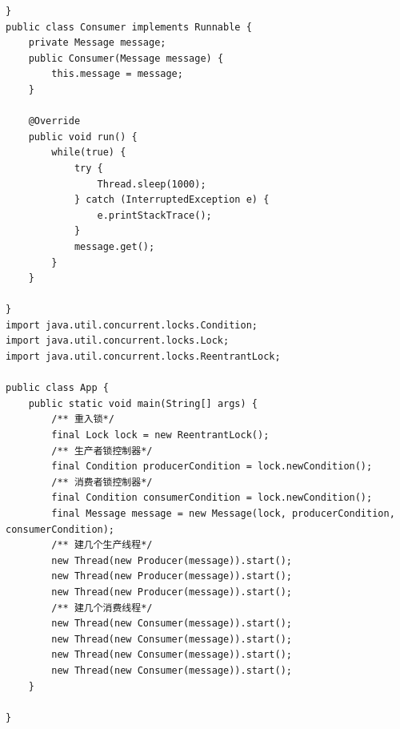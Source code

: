 \begin{lstlisting}
}
public class Consumer implements Runnable {
	private Message message;
	public Consumer(Message message) {
		this.message = message;
	}
	
	@Override
	public void run() {
		while(true) {
			try {
				Thread.sleep(1000);
			} catch (InterruptedException e) {
				e.printStackTrace();
			}
			message.get();
		}
	}
	
}
import java.util.concurrent.locks.Condition;
import java.util.concurrent.locks.Lock;
import java.util.concurrent.locks.ReentrantLock;

public class App {
	public static void main(String[] args) {
		/** 重入锁*/
		final Lock lock = new ReentrantLock();
		/** 生产者锁控制器*/
		final Condition producerCondition = lock.newCondition();
		/** 消费者锁控制器*/
		final Condition consumerCondition = lock.newCondition();
		final Message message = new Message(lock, producerCondition, consumerCondition);
		/** 建几个生产线程*/
		new Thread(new Producer(message)).start();
		new Thread(new Producer(message)).start();
		new Thread(new Producer(message)).start();
		/** 建几个消费线程*/
		new Thread(new Consumer(message)).start();
		new Thread(new Consumer(message)).start();
		new Thread(new Consumer(message)).start();
		new Thread(new Consumer(message)).start();
	}
	
}


\end{lstlisting}
